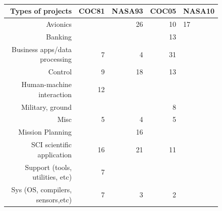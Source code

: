 \documentclass{sig-alternate}
\begin{document}
\begin{figure}[!t]
\begin{center}

~\\~\\~\\

{\scriptsize
\begin{tabular}{r|@{~}r|@{~}r|@{~}r|@{~}l}

Types of projects& COC81 & NASA93& COC05 &NASA10\\\hline\hline
Avionics&     &26&10&17\\\hline
Banking&       &      &13&     \\\hline
Business apps/data processing&7&4&31&  \\\hline   
Control&9&18&13&     \\\hline
Human-machine interaction&12&       &       &     \\\hline
Military, ground&       &       &8&     \\\hline
Misc&5&4&5&     \\\hline
Mission Planning&      &16&       &     \\\hline
SCI scientific application&16&21&11&     \\\hline
Support (tools, utilities, etc)&7&        &       &   \\\hline  
Sys (OS, compilers, sensors,etc)&7&3&2&     
     

\end{tabular}}


\end{center}
\end{figure}
\end{document}
